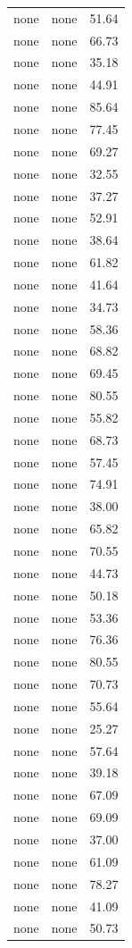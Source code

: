 \begin{tabular}{rrr}
none & none & 51.64 \\
none & none & 66.73 \\
none & none & 35.18 \\
none & none & 44.91 \\
none & none & 85.64 \\
none & none & 77.45 \\
none & none & 69.27 \\
none & none & 32.55 \\
none & none & 37.27 \\
none & none & 52.91 \\
none & none & 38.64 \\
none & none & 61.82 \\
none & none & 41.64 \\
none & none & 34.73 \\
none & none & 58.36 \\
none & none & 68.82 \\
none & none & 69.45 \\
none & none & 80.55 \\
none & none & 55.82 \\
none & none & 68.73 \\
none & none & 57.45 \\
none & none & 74.91 \\
none & none & 38.00 \\
none & none & 65.82 \\
none & none & 70.55 \\
none & none & 44.73 \\
none & none & 50.18 \\
none & none & 53.36 \\
none & none & 76.36 \\
none & none & 80.55 \\
none & none & 70.73 \\
none & none & 55.64 \\
none & none & 25.27 \\
none & none & 57.64 \\
none & none & 39.18 \\
none & none & 67.09 \\
none & none & 69.09 \\
none & none & 37.00 \\
none & none & 61.09 \\
none & none & 78.27 \\
none & none & 41.09 \\
none & none & 50.73 \\

\end{tabular}
